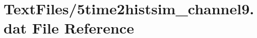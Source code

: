 \hypertarget{5time2histsim__channel9_8dat}{}\section{Text\+Files/5time2histsim\+\_\+channel9.dat File Reference}
\label{5time2histsim__channel9_8dat}
